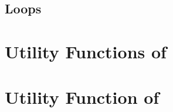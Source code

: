 \subsection{Loops}


\section{Utility Functions of \PGF}

\section{Utility Function of \PGFPlots}

\printindex



